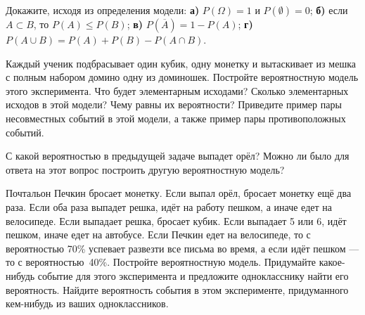 \zpdag Докажите, исходя из определения модели: \textbf{а)} $P(\Omega)=1$ и $P(\emptyset)=0$; \textbf{б)} если $A\subset B$, то $P(A)\le P(B)$; \textbf{в)} $P(\overline{A})=1-P(A)$; \textbf{г)} $P(A\cup B)=P(A)+P(B)-P(A\cap B)$.

\zp Каждый ученик подбрасывает один кубик, одну монетку и вытаскивает из мешка с полным набором домино одну из доминошек. Постройте вероятностную модель этого эксперимента. Что будет элементарным исходами? Сколько элементарных исходов в этой модели? Чему равны их вероятности? Приведите пример пары несовместных событий в этой модели, а также пример пары противоположных событий.

\zp С какой вероятностью в предыдущей задаче выпадет орёл? Можно ли было   для ответа на этот вопрос  построить другую вероятностную модель?

\z Почтальон Печкин бросает монетку. Если выпал орёл, бросает монетку ещё два раза. Если оба раза выпадет решка, идёт на работу пешком, а иначе едет  на велосипеде. Если выпадает решка, бросает кубик. Если выпадает 5 или 6, идёт пешком, иначе едет на автобусе. Если Печкин едет на велосипеде, то с вероятностью 70\%  успевает развезти все письма во время, а если идёт пешком --- то с вероятностью~40\%.  Постройте вероятностную модель.
 Придумайте какое-нибудь событие для этого эксперимента и предложите однокласснику найти его вероятность.
 Найдите вероятность события в этом эксперименте, придуманного кем-нибудь из ваших одноклассников.

